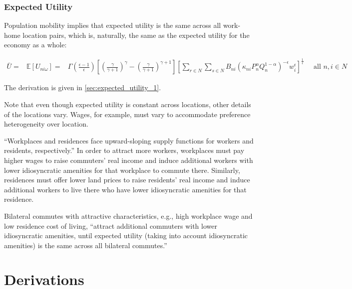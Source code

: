 \documentclass[10pt]{article}
\begin{document}
\subsubsection{Expected Utility}

Population mobility implies 
that expected utility 
is the same across 
all work-home location pairs,
which is, naturally, the same as the expected 
utility for the economy as a whole:

\begin{align}
    \bar{U}=&\mathbb{E}\left[U_{n i \omega}\right]
    =&\Gamma\left(\frac{\epsilon-1}{\epsilon}\right) \left[\left(\frac{\gamma}{\gamma+1}\right)^\gamma-\left(\frac{\gamma}{\gamma+1}\right)^{\gamma+1}\right] \left[\sum_{r \in N} \sum_{s \in N} B_{n i}\left(\kappa_{n i} P_n^\alpha Q_n^{1-\alpha}\right)^{-\epsilon} w_i^\epsilon\right]^{\frac{1}{\epsilon}} \quad \text { all } n, i \in N \label{eq:expected_utility_1}
\end{align}

The derivation is given in \autoref{sec:expected_utility_1}.

Note that even though expected utility 
is constant across locations, other 
details of the locations vary. 
Wages, for example, must vary to accommodate 
preference heterogeneity over location. 

``Workplaces and residences face upward-sloping supply 
functions for workers and residents, respectively.''
In order to attract more workers, workplaces must pay 
higher wages to raise commuters' real income and
induce additional workers
with lower idiosyncratic amenities for that 
workplace to commute there.
Similarly, residences must offer lower land prices 
to raise residents' real income and induce additional
workers to live there who have lower idiosyncratic amenities
for that residence.

Bilateral commutes with attractive characteristics, 
e.g., high workplace wage and low residence cost of living, 
``attract additional commuters with lower 
idiosyncratic amenities, until expected utility 
(taking into account idiosyncratic amenities) 
is the same across all bilateral commutes.''

\section{Derivations}
\end{document}
